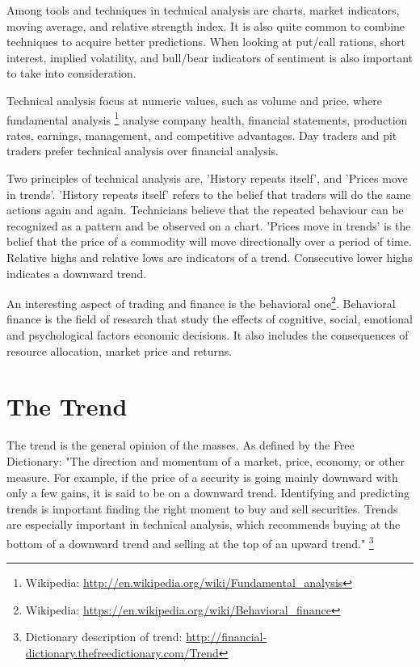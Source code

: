Among tools and techniques in technical analysis are charts, market indicators,
moving average, and relative strength index. It is also quite common to combine
techniques to acquire better predictions. When looking at put/call rations,
short interest, implied volatility, and bull/bear indicators of sentiment is
also important to take into consideration. 

Technical analysis focus at numeric values, such as volume and price, where fundamental analysis \footnote{Wikipedia:
\url{http://en.wikipedia.org/wiki/Fundamental_analysis}} analyse company health,
financial statements, production rates, earnings, management, and competitive
advantages. Day traders and pit traders prefer technical analysis over
financial analysis.   

Two principles of technical analysis are, 'History repeats itself', and
'Prices move in trends'. 'History repeats itself' refers to the belief that
traders will do the same actions again and again. Technicians believe that the
repeated behaviour can be recognized as a pattern and be observed on a chart.
'Prices move in trends' is the belief that the price of a commodity will move
directionally over a period of time. Relative highs and relative lows are
indicators of a trend. Consecutive lower highs indicates a downward trend.  

An interesting aspect of trading and finance is the behavioral
one\footnote{Wikipedia:
\url{https://en.wikipedia.org/wiki/Behavioral_finance}}.
Behavioral finance is the field of research that study the effects of
cognitive, social, emotional and psychological factors economic decisions. It
also includes the consequences of resource allocation, market price and
returns. 
%

\section{The Trend}\label{previous_work:trends}
The trend is the general opinion of the masses. As defined by the Free
Dictionary:  
"The direction and momentum of a market, price, economy, or other measure. For
example, if the price of a security is going mainly downward with only a few
gains, it is said to be on a downward trend. Identifying and
predicting trends is important finding the right moment to buy and sell
securities. Trends are especially important in technical analysis, which
recommends buying at the bottom of a downward trend and selling at the top of an
upward trend."
\footnote{Dictionary description of trend: \url{http://financial-dictionary.thefreedictionary.com/Trend}}

